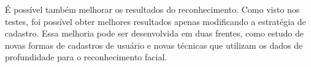 É possível também melhorar os resultados do reconhecimento. Como visto nos testes, foi possível obter melhores resultados apenas modificando a estratégia de cadastro. Essa melhoria pode ser desenvolvida em duas frentes, como estudo de novas formas de cadastros de usuário e novas técnicas que utilizam os dados de profundidade para o reconhecimento facial.





